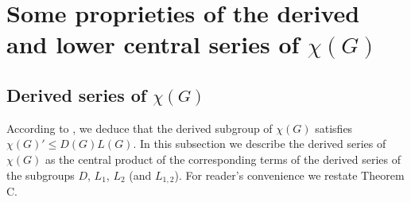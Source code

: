 \documentclass[12pt,leqno]{amsart}
\begin{document}
\section{Some proprieties of the derived and lower central series of \texorpdfstring{$\chi(G)$}{χ(G)}}

\subsection{Derived series of $\chi(G)$}

According to \cite[Proposition 4.1.4]{Sidki}, we deduce that the derived subgroup of $\chi(G)$ satisfies $\chi(G)' \leqslant D(G)L(G)$. In this subsection we describe the derived series of $\chi(G)$ as the central product of the corresponding terms of the derived series of the subgroups $D$, $L_1$, $L_2$ (and $L_{1,2}$). For reader's convenience we restate Theorem C.
\end{document}

